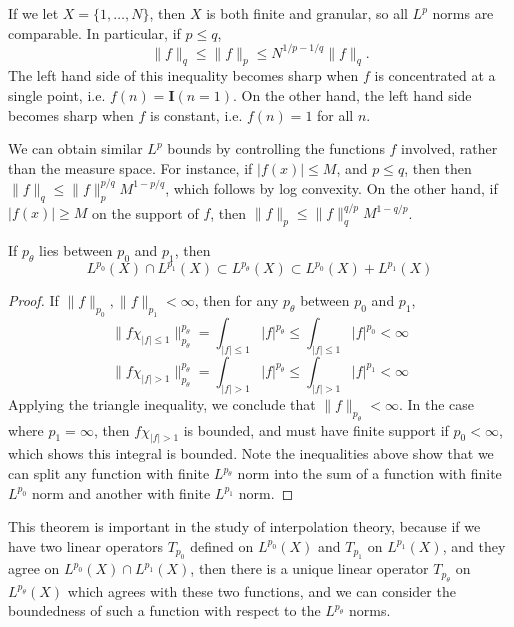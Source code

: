 \begin{remark}
  If we let $X = \{ 1, \dots, N \}$, then $X$ is both finite and granular, so all $L^p$ norms are comparable. In particular, if $p \leq q$,
  \[ \| f \|_q \leq \| f \|_p \leq N^{1/p - 1/q} \| f \|_q. \]
  The left hand side of this inequality becomes sharp when $f$ is concentrated at a single point, i.e. $f(n) = \mathbf{I}(n = 1)$. On the other hand, the left hand side becomes sharp when $f$ is constant, i.e. $f(n) = 1$ for all $n$.
\end{remark}

\begin{example}
    We can obtain similar $L^p$ bounds by controlling the functions $f$ involved, rather than the measure space. For instance, if $|f(x)| \leq M$, and $p \leq q$, then then $\| f \|_q \leq \| f \|_p^{p/q} M^{1 - p/q}$, which follows by log convexity. On the other hand, if $|f(x)| \geq M$ on the support of $f$, then $\| f \|_p \leq \| f \|_q^{q/p} M^{1-q/p}$.
\end{example}

\begin{theorem}
  If $p_\theta$ lies between $p_0$ and $p_1$, then
  \[ L^{p_0}(X) \cap L^{p_1}(X) \subset L^{p_\theta}(X) \subset L^{p_0}(X) + L^{p_1}(X) \]
\end{theorem}
\begin{proof}
  If $\| f \|_{p_0}, \| f \|_{p_1} < \infty$, then for any $p_\theta$ between $p_0$ and $p_1$,
  \[ \| f \chi_{|f| \leq 1} \|_{p_\theta}^{p_\theta} = \int_{|f| \leq 1} |f|^{p_\theta} \leq \int_{|f| \leq 1} |f|^{p_0} < \infty \]
  \[ \| f \chi_{|f| > 1} \|_{p_\theta}^{p_\theta} = \int_{|f| > 1} |f|^{p_\theta} \leq \int_{|f| > 1} |f|^{p_1} < \infty \]
  Applying the triangle inequality, we conclude that $\| f \|_{p_\theta} < \infty$. In the case where $p_1 = \infty$, then $f \chi_{|f| > 1}$ is bounded, and must have finite support if $p_0 < \infty$, which shows this integral is bounded. Note the inequalities above show that we can split any function with finite $L^{p_\theta}$ norm into the sum of a function with finite $L^{p_0}$ norm and another with finite $L^{p_1}$ norm.
\end{proof}

This theorem is important in the study of interpolation theory, because if we have two linear operators $T_{p_0}$ defined on $L^{p_0}(X)$ and $T_{p_1}$ on $L^{p_1}(X)$, and they agree on $L^{p_0}(X) \cap L^{p_1}(X)$, then there is a unique linear operator $T_{p_\theta}$ on $L^{p_\theta}(X)$ which agrees with these two functions, and we can consider the boundedness of such a function with respect to the $L^{p_\theta}$ norms.

